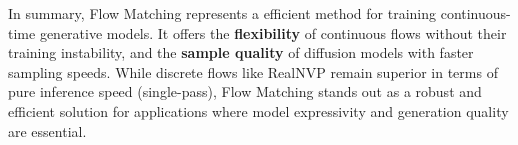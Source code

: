 \documentclass{article}
\begin{document}
In summary, Flow Matching represents a efficient method for training continuous-time generative models. It offers the \textbf{flexibility} of continuous flows without their training instability, and the \textbf{sample quality} of diffusion models with faster sampling speeds. While discrete flows like RealNVP remain superior in terms of pure inference speed (single-pass), Flow Matching stands out as a robust and efficient solution for applications where model expressivity and generation quality are essential.

\newpage


\end{document}
